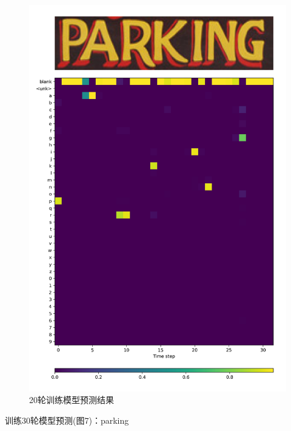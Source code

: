 \documentclass[a4paper]{article}
\begin{document}
\begin{figure}
    \centering
    \includegraphics[width=12cm]{Fig_6.jpg}
    \caption{20轮训练模型预测结果}
\end{figure}
训练30轮模型预测(图7)：parking \\
\end{document}
